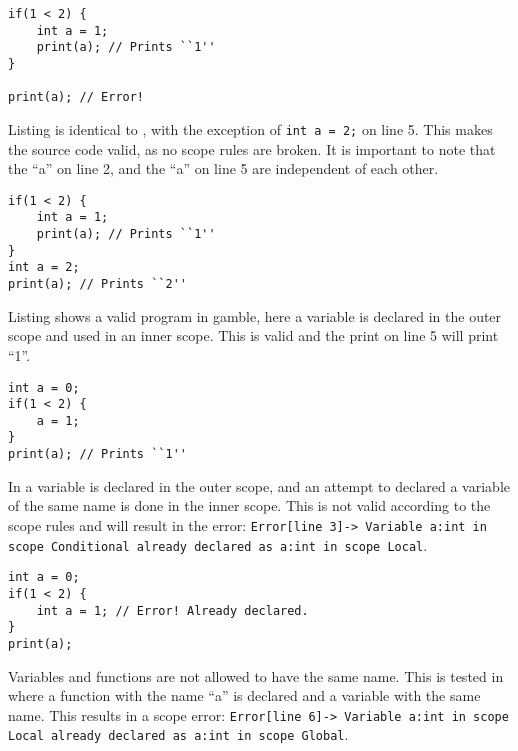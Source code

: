 \begin{lstlisting}[caption={Example of a scope error in \gls{gamble}},label={lst:scope1},frame=tb]
if(1 < 2) {
    int a = 1;
    print(a); // Prints ``1''
}

print(a); // Error!
\end{lstlisting}

Listing  is identical to , with the exception of \texttt{int a = 2;} on line 5.
This makes the source code valid, as no scope rules are broken.
It is important to note that the ``a'' on line 2, and the ``a'' on line 5 are independent of each other.

\begin{lstlisting}[caption={Example of a valid program in \gls{gamble}},label={lst:scope2},frame=tb]
if(1 < 2) {
    int a = 1;
    print(a); // Prints ``1''
}
int a = 2;
print(a); // Prints ``2''
\end{lstlisting}

Listing  shows a valid program in \gls{gamble}, here a variable is declared in the outer scope and used in an inner scope.
This is valid and the print on line 5 will print ``1''.

\begin{lstlisting}[caption={Example of a valid program in \gls{gamble}},label={lst:scope3},frame=tb]
int a = 0;
if(1 < 2) {
    a = 1;
}
print(a); // Prints ``1''
\end{lstlisting}

In  a variable is declared in the outer scope, and an attempt to declared a variable of the same name is done in the inner scope.
This is not valid according to the scope rules and will result in the error: \texttt{Error[line    3]-> Variable a:int in scope Conditional already declared as a:int in scope Local}.

\begin{lstlisting}[caption={Example of a redeclaration error in \gls{gamble}},label={lst:scope4},frame=tb]
int a = 0;
if(1 < 2) {
    int a = 1; // Error! Already declared.
}
print(a);
\end{lstlisting}

Variables and functions are not allowed to have the same name.
This is tested in  where a function with the name ``a'' is declared and a variable with the same name.
This results in a scope error: \texttt{Error[line    6]-> Variable a:int in scope Local already declared as a:int in scope Global}.

